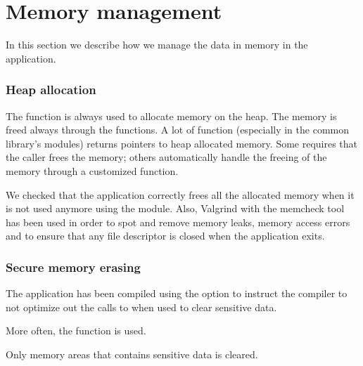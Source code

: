 \section{Memory management}\label{sec:memory}

In this section we describe how we manage the data in memory in the application.

\subsubsection{Heap allocation}

The  function is always used to allocate memory on the
heap. The memory is freed always through the 
functions. A lot of function (especially in the common library's modules)
returns pointers to heap allocated memory. Some requires that the caller frees
the memory; others automatically handle the freeing of the memory through a
customized  function.

We checked that the application correctly frees all the allocated memory when it
is not used anymore using the  module. Also, Valgrind with the
memcheck tool has been used in order to spot and remove memory leaks, memory
access errors and to ensure that any file descriptor is closed when the
application exits.

\subsubsection{Secure memory erasing}

The application has been compiled using the  option
to instruct the compiler to not optimize out the calls to  when
used to clear sensitive data.

More often, the  function is used.

Only memory areas that contains sensitive data  is cleared.
